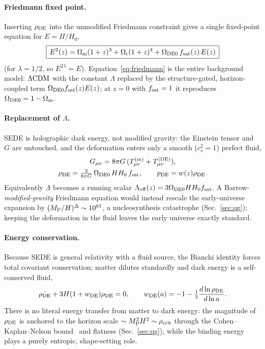 \paragraph{Friedmann fixed point.}
Inserting $\rho_{\mathrm{DE}}$ into the unmodified Friedmann constraint gives a single fixed-point equation for
$E=H/H_0$,
\begin{equation}
\boxed{\,E^2(z)=\Omega_{\mathrm m}(1+z)^3+\Omega_{\mathrm r}(1+z)^4+\Omega_{\mathrm{DE0}}\,f_{\mathrm{sat}}(z)\,E(z)\,}
\label{eq:friedmann}
\end{equation}
(for $\lambda=1/2$, so $E^{2\lambda}=E$). Equation~\eqref{eq:friedmann} is the entire background model:
$\Lambda\mathrm{CDM}$ with the constant $\Lambda$ replaced by the structure-gated, horizon-coupled term
$\Omega_{\mathrm{DE0}}f_{\mathrm{sat}}(z)E(z)$; at $z=0$ with $f_{\mathrm{sat}}=1$ it reproduces $\Omega_{\mathrm{DE0}}=1-\Omega_{\mathrm m}$.

\paragraph{Replacement of $\Lambda$.}
SEDE is holographic dark energy, not modified gravity: the Einstein tensor and $G$ are untouched, and
the deformation enters only a smooth ($c_s^2=1$) perfect fluid,
\begin{equation}
\begin{gathered}
G_{\mu\nu}=8\pi G\,(T^{\rm (m)}_{\mu\nu}+T^{\rm (DE)}_{\mu\nu}),\\
\rho_{\mathrm{DE}}=\tfrac{3}{8\pi G}\,\Omega_{\mathrm{DE0}}\,H H_0\,f_{\mathrm{sat}},\qquad p_{\mathrm{DE}}=w(z)\rho_{\mathrm{DE}} .
\end{gathered}
\label{eq:efe}
\end{equation}
Equivalently $\Lambda$ becomes a running scalar $\Lambda_{\rm eff}(z)=3\Omega_{\mathrm{DE0}} H H_0f_{\mathrm{sat}}$. A
Barrow-\emph{modified-gravity} Friedmann equation would instead rescale the early-universe expansion by
$(M_{\mathrm P}/H)^\Delta\sim10^{61}$, a nucleosynthesis catastrophe (Sec.~\ref{sec:qg}); keeping the
deformation in the fluid leaves the early universe exactly standard.

\paragraph{Energy conservation.}
Because SEDE is general relativity with a fluid source, the Bianchi identity forces total covariant
conservation; matter dilutes standardly and dark energy is a self-conserved fluid,
\begin{equation}
\dot{\rho_{\mathrm{DE}}}+3H(1+w_{\rm DE})\rho_{\mathrm{DE}}=0,\qquad
w_{\rm DE}(a)=-1-\tfrac13\frac{d\ln\rho_{\mathrm{DE}}}{d\ln a}.
\label{eq:cons}
\end{equation}
There is no literal energy transfer from matter to dark energy: the magnitude of $\rho_{\mathrm{DE}}$ is anchored
to the horizon scale $\sim M_{\mathrm P}^2H^2\sim\rho_{\mathrm{crit}}$ through the Cohen--Kaplan--Nelson
bound~\cite{Cohen:1998zx} and flatness (Sec.~\ref{sec:qg}), while the binding energy plays a purely
entropic, shape-setting role.

